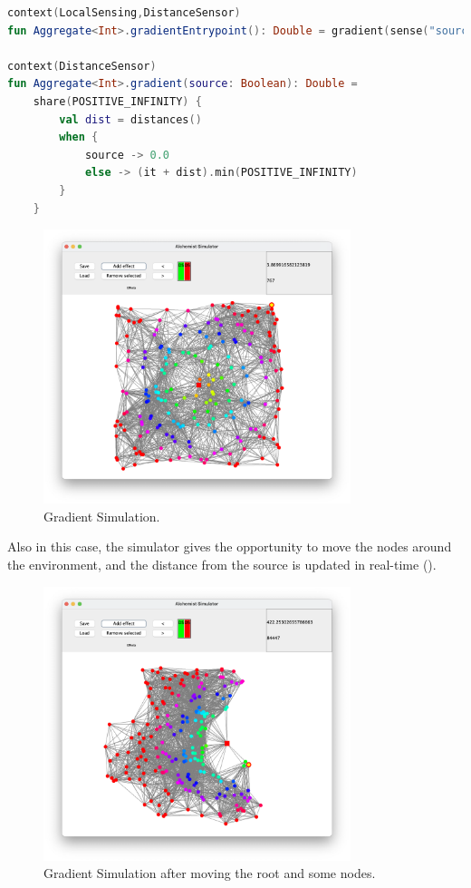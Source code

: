 \begin{lstlisting}[language=kt, caption={Gradient code example}, label={lst:gradient-example}]
context(LocalSensing,DistanceSensor)
fun Aggregate<Int>.gradientEntrypoint(): Double = gradient(sense("source"))

context(DistanceSensor)
fun Aggregate<Int>.gradient(source: Boolean): Double =
    share(POSITIVE_INFINITY) {
        val dist = distances()
        when {
            source -> 0.0
            else -> (it + dist).min(POSITIVE_INFINITY)
        }
    }
\end{lstlisting}

\begin{figure}[ht!]
    \centering
    \includegraphics[width=0.8\textwidth]{figures/gradient}
    \caption{Gradient Simulation.}
    \label{fig:gradient}
\end{figure}

Also in this case, the simulator gives the opportunity to move the nodes around the environment, and the distance from
the source is updated in real-time ().

\begin{figure}[ht!]
    \centering
    \includegraphics[width=0.8\textwidth]{figures/gradient-moved}
    \caption{Gradient Simulation after moving the root and some nodes.}
    \label{fig:gradient-moved}
\end{figure}

